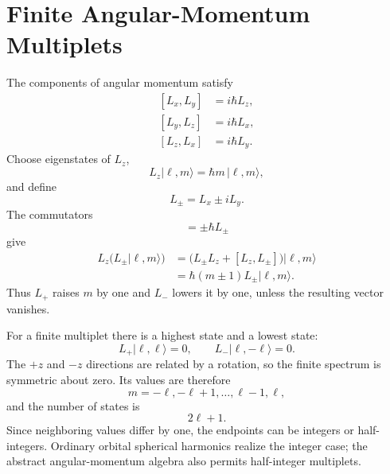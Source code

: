 \section{Finite Angular-Momentum Multiplets}

The components of angular momentum satisfy
\begin{equation}
\begin{aligned}
[L_x,L_y]&=i\hbar L_z,\\
[L_y,L_z]&=i\hbar L_x,\\
[L_z,L_x]&=i\hbar L_y.
\end{aligned}
\end{equation}
Choose eigenstates of \(L_z\),
\begin{equation}
L_z|\ell,m\rangle=\hbar m\,|\ell,m\rangle,
\end{equation}
and define
\begin{equation}
L_\pm=L_x\pm iL_y.
\end{equation}
The commutators
\begin{equation}
[L_z,L_\pm]=\pm\hbar L_\pm
\end{equation}
give
\begin{align}
L_z\bigl(L_\pm|\ell,m\rangle\bigr)
&=\bigl(L_\pm L_z+[L_z,L_\pm]\bigr)|\ell,m\rangle \\
&=\hbar(m\pm1)L_\pm|\ell,m\rangle.
\end{align}
Thus \(L_+\) raises \(m\) by one and \(L_-\) lowers it by one, unless the resulting vector vanishes.

For a finite multiplet there is a highest state and a lowest state:
\begin{equation}
L_+|\ell,\ell\rangle=0,
\qquad
L_-|\ell,-\ell\rangle=0.
\end{equation}
The \(+z\) and \(-z\) directions are related by a rotation, so the finite spectrum is symmetric about zero. Its values are therefore
\begin{equation}
m=-\ell,-\ell+1,\ldots,\ell-1,\ell,
\end{equation}
and the number of states is
\begin{equation}
2\ell+1.
\end{equation}
Since neighboring values differ by one, the endpoints can be integers or half-integers. Ordinary orbital spherical harmonics realize the integer case; the abstract angular-momentum algebra also permits half-integer multiplets.

\begin{classroomqa}
\end{classroomqa}

